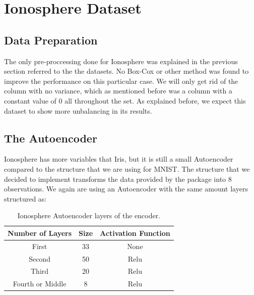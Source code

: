\section{Ionosphere Dataset}
\subsection{Data Preparation}

The only pre-proccessing done for Ionosphere was explained in the previous section referred to the the datasets. No Box-Cox or other method was found to improve the performance on this particular case. We will only get rid of the column with no variance, which as mentioned before was a column with a constant value of 0 all throughout the set. As explained before, we expect this dataset to show more unbalancing in its results.

\subsection{The Autoencoder}

Ionosphere has more variables that Iris, but it is still a small Autoencoder compared to the structure that we are using for MNIST. The structure that we decided to implement transforms the data provided by the package into 8 observations. We again are using an Autoencoder with the same amount layers structured as:  \newline

\begin{table}[H]
	\caption{Ionosphere Autoencoder layers of the encoder.}
	\begin{center}
		\label{tab:table_Ionosphere_auto_encoder}
		\begin{tabular}{c|c|c} %
			\textbf{Number of Layers} & \textbf{Size} & \textbf{Activation Function} \\
			\hline
			First & 33 & None\\
			Second & 50 & Relu\\
			Third & 20 & Relu\\
			Fourth or Middle & 8 & Relu\\
		\end{tabular}
	\end{center}
\end{table}

